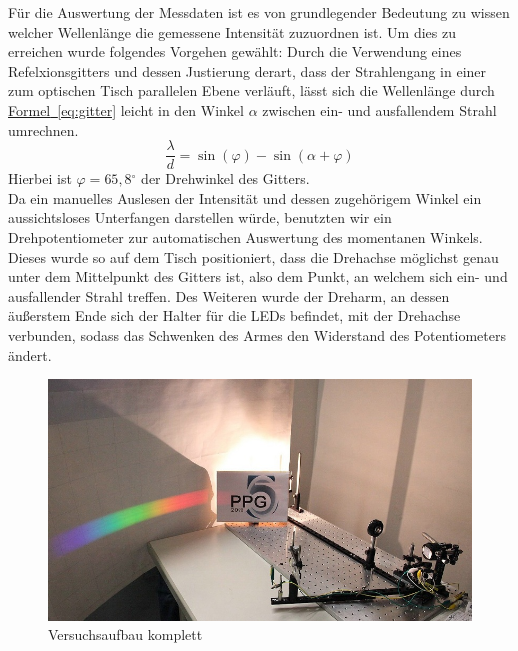 \documentclass[11pt]{scrartcl}
\newcommand{\degr}{\ensuremath{^\circ}}
\newcommand{\hypref}[2]{\hyperref[#2]{{#1}~\ref{#2}}}
\begin{document}
F\"ur die Auswertung der Messdaten ist es von grundlegender Bedeutung zu wissen welcher Wellenl\"ange die gemessene Intensit\"at zuzuordnen ist. Um dies zu erreichen wurde folgendes Vorgehen gew\"ahlt: Durch die Verwendung eines Refelxionsgitters und dessen Justierung derart, dass der Strahlengang in einer zum optischen Tisch parallelen Ebene verl\"auft, l\"asst sich die Wellenl\"ange durch \hypref{Formel}{eq:gitter} leicht in den Winkel $\alpha$ zwischen ein- und ausfallendem Strahl umrechnen.
\begin{equation}
\frac{\lambda}{d} = \sin(\varphi) - \sin(\alpha + \varphi)
\label{eq:gitter}
\end{equation}
Hierbei ist $\varphi = 65,8\degr$ der Drehwinkel des Gitters.\\
Da ein manuelles Auslesen der Intensit\"at und dessen zugeh\"origem Winkel ein aussichtsloses Unterfangen darstellen w\"urde, benutzten wir ein Drehpotentiometer zur automatischen Auswertung des momentanen Winkels. Dieses wurde so auf dem Tisch positioniert, dass die Drehachse m\"oglichst genau unter dem Mittelpunkt des Gitters ist, also dem Punkt, an welchem sich ein- und ausfallender Strahl treffen. Des Weiteren wurde der Dreharm, an dessen äu\ss{}erstem Ende sich der Halter f\"ur die LEDs befindet, mit der Drehachse verbunden, sodass das Schwenken des Armes den Widerstand des Potentiometers \"andert.

\begin{figure}[ht]
\begin{center}
\includegraphics[width=1.\textwidth]{aufbau_spektrum.jpg}
\end{center}
\vspace{-1.5\baselineskip}
\caption{Versuchsaufbau komplett}
\label{fig:aufbau_spektrum}
\end{figure}
\end{document}
